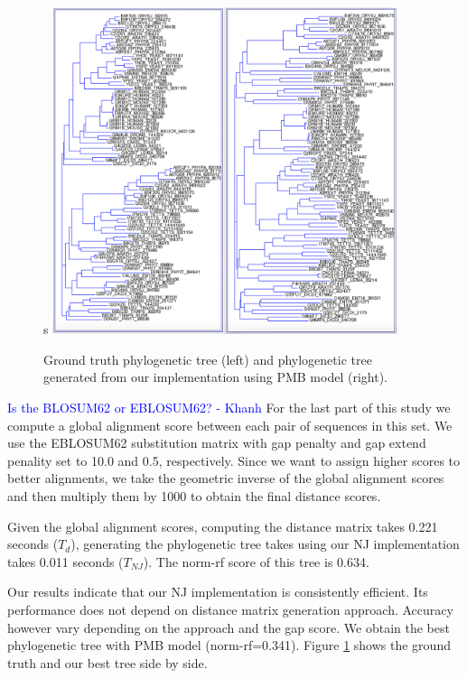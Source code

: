 \documentclass[11pt,letterpaper]{article}
\newcommand\kcomment[1]{\textcolor{blue}{#1 - Khanh}}
\theoremstyle{definition}
\begin{document}
\begin{figure}[t]
  s\centering
  \includegraphics[width=0.9\textwidth]{gt-PMB.jpg}
  \caption{Ground truth phylogenetic tree (left) and phylogenetic tree generated from our implementation using PMB model (right).}
  \label{fig:gt-PMB}
\end{figure}


\kcomment{Is the BLOSUM62 or EBLOSUM62?}
For the last part of this study we compute a global alignment score between each pair of sequences in this set. We use the EBLOSUM62 substitution matrix with gap penalty and gap extend penality set to 10.0 and 0.5, respectively. Since we want to assign higher scores to better alignments, we take the geometric inverse of the global alignment scores and then multiply them by 1000 to obtain the final distance scores.


Given the global alignment scores, computing the distance matrix takes 0.221 seconds ($T_d$), generating the phylogenetic tree takes using our NJ implementation takes 0.011 seconds ($T_{NJ}$). The norm-rf score of this tree is 0.634. 

Our results indicate that our NJ implementation is consistently efficient. Its performance does not depend on distance matrix generation approach. Accuracy however vary depending on the approach and the gap score. We obtain the best phylogenetic tree with PMB model (norm-rf=0.341). Figure \ref{fig:gt-PMB} shows the ground truth and our best tree side by side. 
\end{document}
